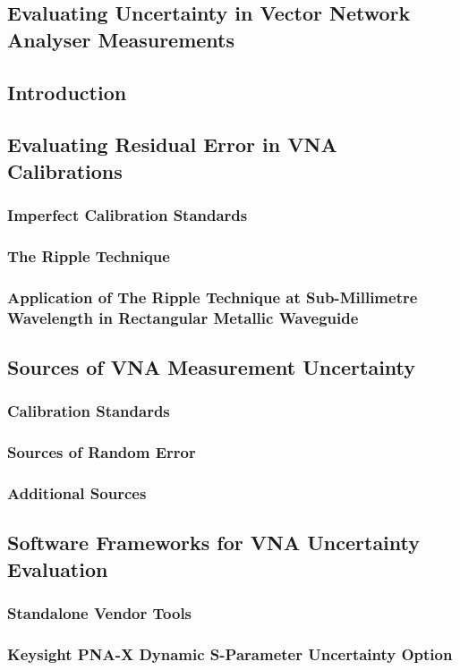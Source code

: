 \documentclass[../thesis.tex]{subfiles}
\begin{document}
\begin{refsection}
\chapter{Evaluating Uncertainty in Vector Network Analyser Measurements}
\section{Introduction}
\section{Evaluating Residual Error in VNA Calibrations}
\subsection{Imperfect Calibration Standards}
\subsection{The Ripple Technique}
\subsection{Application of The Ripple Technique at Sub-Millimetre Wavelength in Rectangular Metallic Waveguide}
\section{Sources of VNA Measurement Uncertainty}
\subsection{Calibration Standards}
\subsection{Sources of Random Error}
\subsection{Additional Sources}
\section{Software Frameworks for VNA Uncertainty Evaluation}
\subsection{Standalone Vendor Tools}
\subsection{Keysight PNA-X Dynamic S-Parameter Uncertainty Option}

\end{refsection}
\end{document}
